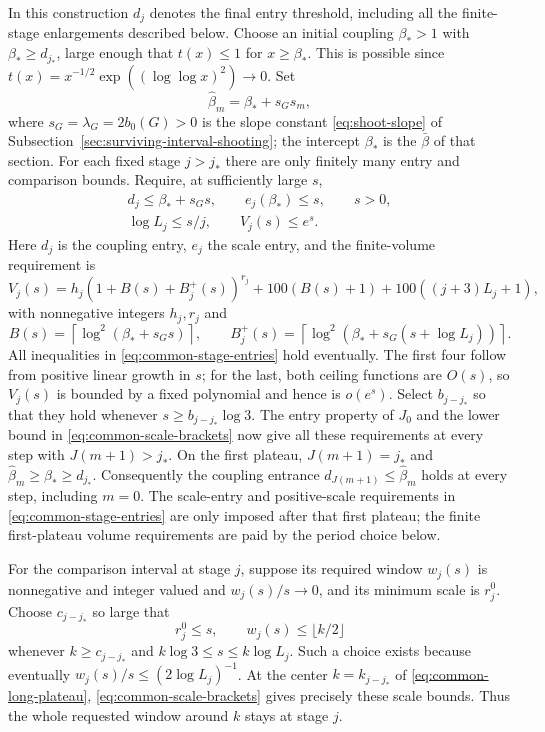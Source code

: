 In this construction $d_j$ denotes the final entry threshold, including
all the finite-stage enlargements described below. Choose an initial
coupling $\beta_*>1$ with $\beta_*\ge d_{j_*}$, large enough that $t(x)\le1$ for
$x\ge\beta_*$. This is possible since
$t(x)=x^{-1/2}\exp((\log\log x)^2)\to0$. Set
\[
                 \widehat\beta_m=\beta_*+s_Gs_m,
\]
where $s_G=\lambda_G=2b_0(G)>0$ is the slope constant
\eqref{eq:shoot-slope} of Subsection~\ref{sec:surviving-interval-shooting};
the intercept $\beta_*$ is the $\bar\beta$ of that section.
For each fixed stage $j>j_*$ there are only finitely many entry
and comparison bounds. Require, at sufficiently large $s$,
\begin{equation}\label{eq:common-stage-entries}
 \begin{gathered}
 d_j\le\beta_*+s_Gs,\qquad e_j(\beta_*)\le s,\qquad s>0,\\
 \log L_j\le s/j,\qquad V_j(s)\le e^s.
 \end{gathered}
\end{equation}
Here $d_j$ is the coupling entry, $e_j$ the scale entry, and the
finite-volume requirement is
\[
 V_j(s)=h_j(1+B(s)+B_j^+(s))^{r_j}
             +100(B(s)+1)+100((j+3)L_j+1),
\]
with nonnegative integers $h_j,r_j$ and
\[
 B(s)=\left\lceil\log^2(\beta_*+s_Gs)\right\rceil,
 \qquad
 B_j^+(s)=\left\lceil
       \log^2(\beta_*+s_G(s+\log L_j))\right\rceil.
\]
All inequalities in \eqref{eq:common-stage-entries} hold eventually.
The first four follow from positive linear growth in $s$; for the
last, both ceiling functions are $O(s)$, so $V_j(s)$ is bounded
by a fixed polynomial and hence is $o(e^s)$. Select $b_{j-j_*}$
so that they hold whenever $s\ge b_{j-j_*}\log3$.
The entry property of $J_0$ and the lower bound in
\eqref{eq:common-scale-brackets} now give all these requirements
at every step with $J(m+1)>j_*$. On the first plateau,
$J(m+1)=j_*$ and $\widehat\beta_m\ge\beta_*\ge d_{j_*}$.
Consequently the coupling entrance $d_{J(m+1)}\le\widehat\beta_m$
holds at every step, including $m=0$. The scale-entry and positive-scale
requirements in \eqref{eq:common-stage-entries} are only imposed after
that first plateau; the finite first-plateau volume requirements are paid
by the period choice below.

For the comparison interval at stage $j$, suppose its required
window $w_j(s)$ is nonnegative and integer valued and $w_j(s)/s\to0$, and its
minimum scale is $r_j^0$. Choose $c_{j-j_*}$ so large that
\[
 r_j^0\le s,\qquad w_j(s)\le\lfloor k/2\rfloor
\]
whenever $k\ge c_{j-j_*}$ and
$k\log3\le s\le k\log L_j$. Such a choice exists because
eventually $w_j(s)/s\le(2\log L_j)^{-1}$.
At the center $k=k_{j-j_*}$ of
\eqref{eq:common-long-plateau}, \eqref{eq:common-scale-brackets}
gives precisely these scale bounds. Thus the whole requested
window around $k$ stays at stage $j$.

